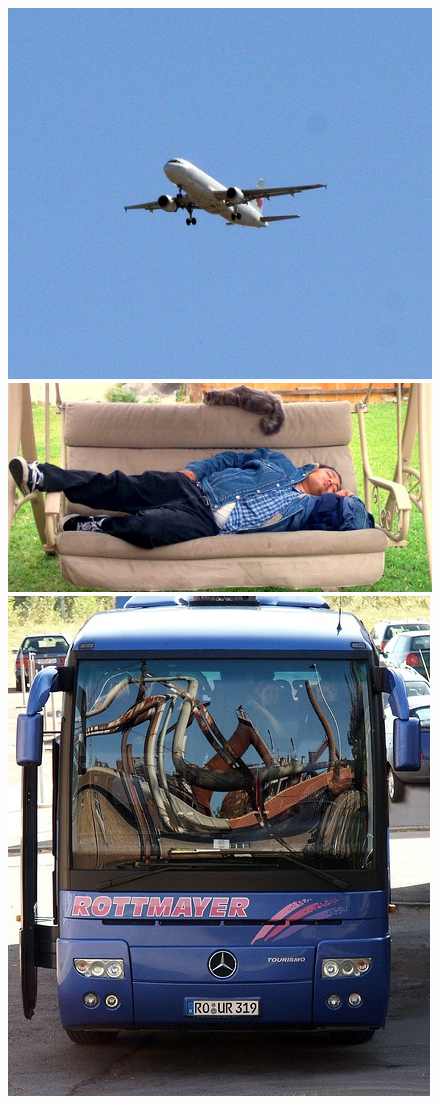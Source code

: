 \documentclass[a4paper]{article}
\begin{document}
\begin{figure}[h]
	\center
	\begin{multicols}{4}
		\includegraphics[width=0.7\linewidth]{fig/000665}
		\includegraphics[width=1.\linewidth]{fig/000662}
		\includegraphics[width=0.7\linewidth]{fig/000663}

\end{multicols}
\end{figure}
\end{document}
